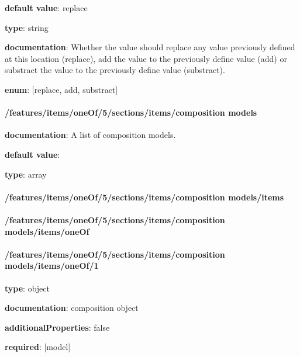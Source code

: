 \begin{itemized}
\item {\bf default value}: replace
\item {\bf type}: string
\item {\bf documentation}: Whether the value should replace any value previously defined at this location (replace), add the value to the previously define value (add) or substract the value to the previously define value (substract).
\item {\bf enum}: [replace, add, substract]\end{itemized}\paragraph{/features/items/oneOf/5/sections/items/composition models} \begin{itemized}
\item {\bf documentation}: A list of composition models.
\item {\bf default value}: 
\item {\bf type}: array
\paragraph{/features/items/oneOf/5/sections/items/composition models/items} \begin{itemized}
\end{itemized}\end{itemized}\paragraph{/features/items/oneOf/5/sections/items/composition models/items/oneOf} \begin{itemized}
\end{itemized}\paragraph{/features/items/oneOf/5/sections/items/composition models/items/oneOf/1} \begin{itemized}
\item {\bf type}: object
\item {\bf documentation}: composition object
\item {\bf additionalProperties}: false
\item {\bf required}: [model]\end{itemized}
